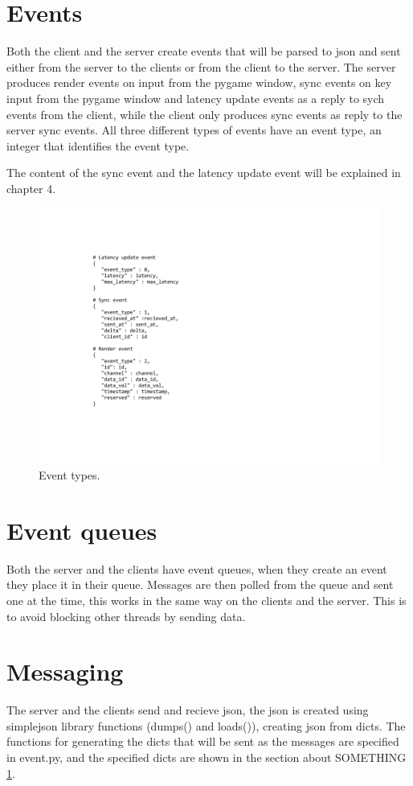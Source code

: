 \section{Events}
Both the client and the server create events that will be parsed to json and sent either from the server to the clients or from the client to the server. The server produces render events on input from the pygame window, sync events on key input from the pygame window and latency update events as a reply to sych events from the client, while the client only produces sync events as reply to the server sync events. All three different types of events have an event type, an integer that identifies the event type.

The content of the sync event and the latency update event will be explained in chapter 4. 

\begin{figure}[h!]
\centering
\includegraphics[width=1.3\textwidth]{figures/events.png}
\caption{Event types.}
\label{events}
\end{figure}

\section{Event queues}
Both the server and the clients have event queues, when they create an event they place it in their queue. Messages are then polled from the queue and sent one at the time, this works in the same way on the clients and the server. This is to avoid blocking other threads by sending data. 

\section{Messaging}
The server and the clients send and recieve json, the json is created using simplejson library functions (dumps() and loads()), creating json from dicts. The functions for generating the dicts that will be sent as the messages are specified in event.py, and the specified dicts are shown in the section about SOMETHING \ref{events}. 

